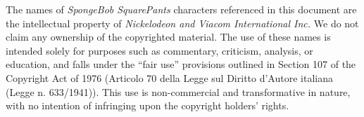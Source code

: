\renewcommand{\thesection}{\Alph{section}}
The names of \textit{SpongeBob SquarePants} characters referenced in this document are the intellectual property of \textit{Nickelodeon and Viacom International Inc.}
We do not claim any ownership of the copyrighted material. The use of these names is intended solely for purposes such as commentary, criticism, analysis, 
or education, and falls under the ``fair use'' provisions outlined in Section 107 of the Copyright Act of 1976 (Articolo 70 della Legge sul Diritto d'Autore 
italiana (Legge n. 633/1941)). This use is non-commercial and transformative in nature, with no intention of infringing upon the copyright holders' rights.
